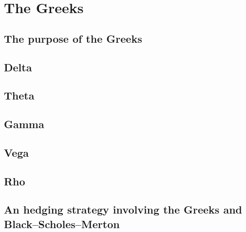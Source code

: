 \documentclass[12pt]{report}
\newcommand{\BSM}{Black--Scholes--Merton }
\begin{document}
\chapter{The Greeks}
\label{cha:The Greeks}


\section{The purpose of the Greeks}
\label{sec:The purpose of the Greeks}


\section{Delta}
\label{sec:Delta}


\section{Theta}
\label{sec:Theta}


\section{Gamma}
\label{sec:Gamma}


\section{Vega}
\label{sec:Vega}


\section{Rho}
\label{sec:Rho}


\section{An hedging strategy involving the Greeks and \BSM}
\label{sec:An hedging strategy involving the Greeks and \BSM}
\end{document}
